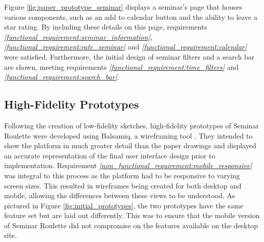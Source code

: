 \documentclass{l4proj}
\begin{document}
Figure \ref{fig:paper_prototype_seminar} displays a seminar's page that houses various components, such as an add to calendar button and the ability to leave a star rating. By including these details on this page, requirements \emph{\ref{functional_requirement:seminar_information}}, \emph{\ref{functional_requirement:rate_seminar}} and \emph{\ref{functional_requirement:calendar}} were satisfied. Furthermore, the initial design of seminar filters and a search bar are shown, meeting requirements \emph{\ref{functional_requirement:time_filters}} and \emph{\ref{functional_requirement:search_bar}}. 

\subsection{High-Fidelity Prototypes}
\label{section:high_fidelity_prototypes}

Following the creation of low-fidelity sketches, high-fidelity prototypes of Seminar Roulette were developed using Balsamiq, a wireframing tool \citep{balsamiq}. They intended to show the platform in much greater detail than the paper drawings and displayed an accurate representation of the final user interface design prior to implementation. Requirement \emph{\ref{non_functional_requirement:mobile_responsive}} was integral to this process as the platform had to be responsive to varying screen sizes. This resulted in wireframes being created for both desktop and mobile, allowing the differences between these views to be understood. As pictured in Figure \ref{fig:initial_prototypes}, the two prototypes have the same feature set but are laid out differently. This was to ensure that the mobile version of Seminar Roulette did not compromise on the features available on the desktop site.
\end{document}
